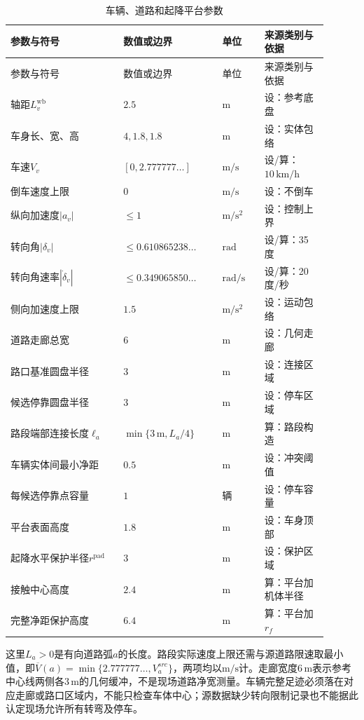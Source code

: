 \begin{longtable}{@{}p{0.32\linewidth}p{0.28\linewidth}p{0.12\linewidth}p{0.18\linewidth}@{}}
\caption{车辆、道路和起降平台参数}\label{s0601:vehicle_parameters}\\
\toprule
参数与符号 & 数值或边界 & 单位 & 来源类别与依据\\
\midrule
\endfirsthead
\toprule
参数与符号 & 数值或边界 & 单位 & 来源类别与依据\\
\midrule
\endhead
\bottomrule
\endfoot
轴距$L_v^{\mathrm{wb}}$ & $2.5$ & $\mathrm m$ & 设：参考底盘\\
车身长、宽、高 & $4,1.8,1.8$ & $\mathrm m$ & 设：实体包络\\
车速$V_v$ & $[0,2.777777\ldots]$ & $\mathrm{m/s}$ & 设/算：$10\,\mathrm{km/h}$\\
倒车速度上限 & $0$ & $\mathrm{m/s}$ & 设：不倒车\\
纵向加速度$|a_v|$ & $\le1$ & $\mathrm{m/s^2}$ & 设：控制上界\\
转向角$|\delta_v|$ & $\le0.610865238\ldots$ & $\mathrm{rad}$ & 设/算：35度\\
转向角速率$|\dot\delta_v|$ & $\le0.349065850\ldots$ & $\mathrm{rad/s}$ & 设/算：20度/秒\\
侧向加速度上限 & $1.5$ & $\mathrm{m/s^2}$ & 设：运动包络\\
道路走廊总宽 & $6$ & $\mathrm m$ & 设：几何走廊\\
路口基准圆盘半径 & $3$ & $\mathrm m$ & 设：连接区域\\
候选停靠圆盘半径 & $3$ & $\mathrm m$ & 设：停车区域\\
路段端部连接长度$\ell_a$ & $\min\{3\,\mathrm m,L_a/4\}$ & $\mathrm m$ & 算：路段构造\\
车辆实体间最小净距 & $0.5$ & $\mathrm m$ & 设：冲突阈值\\
每候选停靠点容量 & $1$ & 辆 & 设：停车容量\\
平台表面高度 & $1.8$ & $\mathrm m$ & 设：车身顶部\\
起降水平保护半径$r^{\mathrm{pad}}$ & $3$ & $\mathrm m$ & 设：保护区域\\
接触中心高度 & $2.4$ & $\mathrm m$ & 算：平台加机体半径\\
完整净距保护高度 & $6.4$ & $\mathrm m$ & 算：平台加$r_f$\\
\end{longtable}

这里$L_a>0$是有向道路弧$a$的长度。路段实际速度上限还需与源道路限速取最小值，即$\overline V(a)=\min\{2.777777\ldots,V_a^{src}\}$，两项均以$\mathrm{m/s}$计。走廊宽度$6\,\mathrm m$表示参考中心线两侧各$3\,\mathrm m$的几何缓冲，不是现场道路净宽测量。车辆完整足迹必须落在对应走廊或路口区域内，不能只检查车体中心；源数据缺少转向限制记录也不能据此认定现场允许所有转弯及停车。

